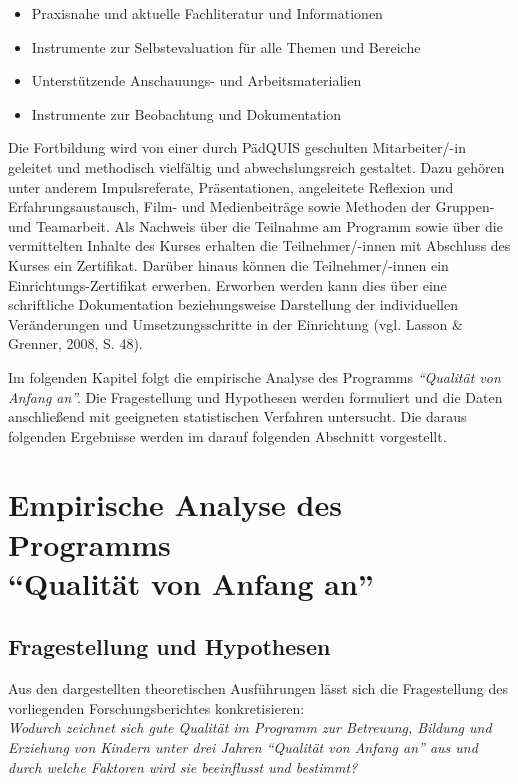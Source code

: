 \documentclass[12pt,a4paper]{article}
\begin{document}
\begin{itemize}

\item Praxisnahe und aktuelle Fachliteratur und Informationen
\item Instrumente zur Selbstevaluation für alle Themen und Bereiche
\item Unterstützende Anschauungs- und Arbeitsmaterialien 
\item Instrumente zur Beobachtung und Dokumentation
\end{itemize}

Die Fortbildung wird von einer durch PädQUIS geschulten Mitarbeiter/-in geleitet und methodisch vielfältig und abwechslungsreich gestaltet. Dazu gehören unter anderem Impulsreferate, Präsentationen, angeleitete Reflexion und Erfahrungsaustausch, Film- und Medienbeiträge sowie Methoden der Gruppen- und Teamarbeit.
Als Nachweis über die Teilnahme am Programm sowie über die vermittelten Inhalte des Kurses erhalten die Teilnehmer/-innen mit Abschluss des Kurses ein Zertifikat. Darüber hinaus können die Teilnehmer/-innen ein Einrichtungs-Zertifikat erwerben. Erworben werden kann dies über eine schriftliche Dokumentation beziehungsweise Darstellung der individuellen Veränderungen und Umsetzungsschritte in der Einrichtung (vgl. Lasson \& Grenner, 2008, S. 48).

Im folgenden Kapitel folgt die empirische Analyse des Programms \textit{"`Qua\-li\-tät von Anfang an"'.} Die Fragestellung und Hypothesen werden formuliert und die Daten anschließend mit geeigneten statistischen Verfahren untersucht. Die daraus folgenden Ergebnisse werden im darauf folgenden Abschnitt vorgestellt.
\pagebreak
\section{Empirische Analyse des Programms\\ "`Qua\-li\-tät von Anfang an"'}
\subsection{Fragestellung und Hypothesen}

Aus den dargestellten theoretischen Ausführungen lässt sich die Fragestellung des vorliegenden Forschungsberichtes konkretisieren:\\

\textit{Wodurch zeichnet sich gute Qualität im Programm zur Betreuung, Bildung und Erziehung von Kindern unter drei Jahren \textit{"`Qualität von Anfang an"'} aus und durch welche Faktoren wird sie beeinflusst und bestimmt?}\\
\end{document}

